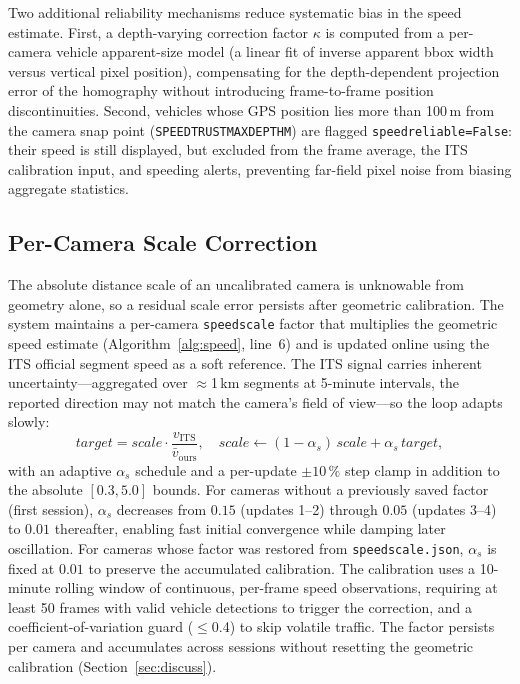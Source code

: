 \documentclass[conference]{IEEEtran}
\renewcommand{\_}{\textunderscore\allowbreak}
\begin{document}
Two additional reliability mechanisms reduce systematic bias in the speed estimate.
First, a depth-varying correction factor $\kappa$ is computed from a per-camera vehicle apparent-size model (a linear fit of inverse apparent bbox width versus vertical pixel position), compensating for the depth-dependent projection error of the homography without introducing frame-to-frame position discontinuities.
Second, vehicles whose GPS position lies more than 100\,m from the camera snap point (\texttt{SPEED\_TRUST\_MAX\_DEPTH\_M}) are flagged \texttt{speed\_reliable=False}: their speed is still displayed, but excluded from the frame average, the ITS calibration input, and speeding alerts, preventing far-field pixel noise from biasing aggregate statistics.

\subsection{Per-Camera Scale Correction}
The absolute distance scale of an uncalibrated camera is unknowable from geometry
alone, so a residual scale error persists after geometric calibration. The system
maintains a per-camera \texttt{speed\_scale} factor that multiplies the geometric
speed estimate (Algorithm~\ref{alg:speed}, line~6) and is updated online using the
ITS official segment speed as a soft reference. The ITS signal carries inherent
uncertainty---aggregated over $\approx$1\,km segments at 5-minute intervals, the
reported direction may not match the camera's field of view---so the loop adapts
slowly:
\begin{equation}
\textit{target} = \textit{scale}\cdot \frac{v_\text{ITS}}{\bar v_\text{ours}},\quad
\textit{scale} \gets (1{-}\alpha_s)\,\textit{scale} + \alpha_s\,\textit{target},
\end{equation}
with an adaptive $\alpha_s$ schedule and a per-update $\pm10\,\%$ step clamp in addition to the absolute $[0.3,5.0]$ bounds.
For cameras without a previously saved factor (first session), $\alpha_s$ decreases from $0.15$ (updates 1--2) through $0.05$ (updates 3--4) to $0.01$ thereafter, enabling fast initial convergence while damping later oscillation.
For cameras whose factor was restored from \texttt{speed\_scale.json}, $\alpha_s$ is fixed at $0.01$ to preserve the accumulated calibration.
The calibration uses a 10-minute rolling window of continuous, per-frame speed observations, requiring at least 50 frames with valid vehicle detections to trigger the correction, and a coefficient-of-variation guard ($\le$0.4) to skip volatile traffic.
The factor persists per camera and accumulates across sessions without resetting the geometric calibration (Section~\ref{sec:discuss}).
\end{document}
